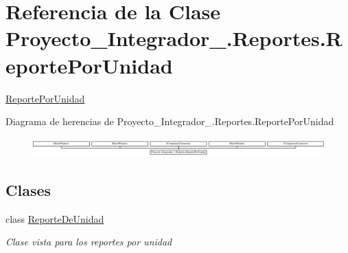 \hypertarget{class_proyecto___integrador__3_1_1_reportes_1_1_reporte_por_unidad}{\section{Referencia de la Clase Proyecto\-\_\-\-Integrador\-\_.\-Reportes.\-Reporte\-Por\-Unidad}
\label{class_proyecto___integrador__3_1_1_reportes_1_1_reporte_por_unidad}
}


\hyperlink{class_proyecto___integrador__3_1_1_reportes_1_1_reporte_por_unidad}{Reporte\-Por\-Unidad}  


Diagrama de herencias de Proyecto\-\_\-\-Integrador\-\_.\-Reportes.\-Reporte\-Por\-Unidad\begin{figure}[H]
\begin{center}
\leavevmode
\includegraphics[height=0.720257cm]{de/dc0/class_proyecto___integrador__3_1_1_reportes_1_1_reporte_por_unidad}
\end{center}
\end{figure}
\subsection*{Clases}
\begin{DoxyCompactItemize}
\item 
class \hyperlink{class_proyecto___integrador__3_1_1_reportes_1_1_reporte_por_unidad_1_1_reporte_de_unidad}{Reporte\-De\-Unidad}
\begin{DoxyCompactList}\small\item\em Clase vista para los reportes por unidad \end{DoxyCompactList}\end{DoxyCompactItemize}
